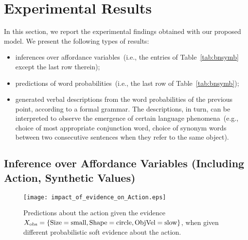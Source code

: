 
\section{Experimental Results}

In this section, we report the experimental findings obtained with our proposed model.
We present the following types of results:
\begin{itemize}
  \item inferences over affordance variables~(i.e., the entries of Table~\ref{tab:bnsymb} except the last row therein);

  \item predictions of word probabilities~(i.e., the last row of Table~\ref{tab:bnsymb});

  \item generated verbal descriptions from the word probabilities of the previous point, according to a formal grammar. The descriptions, in turn, can be interpreted to observe the emergence of certain language phenomena~(e.g., choice of most appropriate conjunction word, choice of synonym words between two consecutive sentences when they refer to the same object).
\end{itemize}

\subsection{Inference over Affordance Variables (Including Action, Synthetic Values)}

\begin{figure}
\centering
\texttt{[image: impact\_of\_evidence\_on\_Action.eps]}
\caption{Predictions about the action given the evidence $X_\text{obs} =\{\text{Size}=\text{small}, \text{Shape}=\text{circle}, \text{ObjVel}=\text{slow}\}$, when given different probabilistic soft evidence about the action.}
\label{fig:impact_of_evidence_on_Action}
\end{figure}

